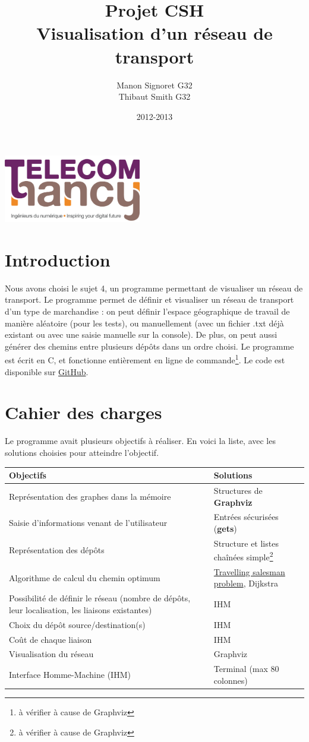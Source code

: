 \documentclass[12pt,a4paper]{report}
\date{2012-2013}
\author{Manon Signoret G32\\Thibaut Smith G32}
\title{Projet CSH\\Visualisation d'un r\'{e}seau de transport}
\makeatletter
\def\maketitle{
  \null
  \begin{flushleft}
   \includegraphics[width=6cm]{telecom_nancy.png}
  \end{flushleft}
  \vfill
  \begin{center}\leavevmode
    \normalfont
    {\LARGE \@title\par}
    {\Large \@date\par} 
    \vskip 1cm
    
  \end{center}
  \vfill
  \hfill
  \begin{flushright}
    {\Large \@author\par}
  \end{flushright}
  \cleardoublepage
  }
\makeatother
\begin{document}
\thispagestyle{empty}
\maketitle
\pagebreak

\section{Introduction}
Nous avons choisi le sujet 4, un programme permettant de visualiser un r\'{e}seau de transport. Le programme permet de d\'{e}finir et visualiser un r\'{e}seau de transport d'un type de marchandise : on peut d\'{e}finir l'espace g\'{e}ographique de travail de mani\`{e}re al\'{e}atoire (pour les tests), ou manuellement (avec un fichier .txt déjà existant ou avec une saisie manuelle sur la console). De plus, on peut aussi g\'{e}n\'{e}rer des chemins entre plusieurs d\'{e}pôts dans un ordre choisi. Le programme est \'{e}crit en C, et fonctionne enti\`{e}rement en ligne de commande\footnote{\`{a} v\'{e}rifier \`{a} cause de Graphviz}. Le code est disponible sur \href{https://github.com/Videl/Graph-Visualization-Manager}{GitHub}.


\section{Cahier des charges}
Le programme avait plusieurs objectifs \`{a} r\'{e}aliser. En voici la liste, avec les solutions choisies pour atteindre l'objectif.

\begin{center}
  \begin{tabular}{|m{7cm}|m{7cm}|}
    \hline
    \textbf{Objectifs} & \textbf{Solutions} \\
    \hline
    Repr\'{e}sentation des graphes dans la m\'{e}moire       & Structures de \textbf{Graphviz} \\
    \hline
    Saisie d'informations venant de l'utilisateur    & Entr\'{e}es s\'{e}curis\'{e}es (\textbf{gets}) \\
    \hline
    Repr\'{e}sentation des d\'{e}pôts                        & Structure et listes chaîn\'{e}es simple\footnote{\`{a} v\'{e}rifier \`{a} cause de Graphviz} \\
    \hline
    Algorithme de calcul du chemin optimum           & \href{https://en.wikipedia.org/wiki/Travelling_salesman_problem}{Travelling salesman problem}, Dijkstra \\
    \hline
    Possibilit\'{e} de d\'{e}finir le r\'{e}seau (nombre de d\'{e}p\^ots, leur localisation, les liaisons existantes)			     &	IHM \\
    \hline
    Choix du d\'{e}p\^ot source/destination(s)			 & IHM \\
    \hline
    Co\^ut de chaque liaison						 & IHM \\
    \hline
  	Visualisation du r\'{e}seau							 & Graphviz \\
    \hline
    Interface Homme-Machine (IHM)                    & Terminal (max 80 colonnes) \\
    \hline
    
  \end{tabular}
\end{center}
\end{document}
